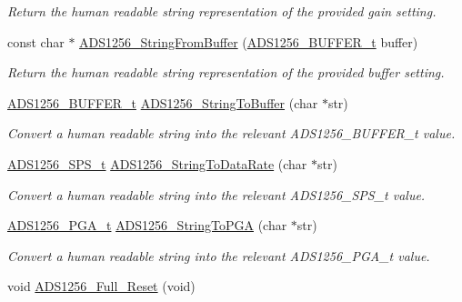 \begin{DoxyCompactItemize}
\begin{DoxyCompactList}\small\item\em Return the human readable string representation of the provided gain setting. \end{DoxyCompactList}\item 
const char $\ast$ \hyperlink{group__ads1256__driver_gafab91604ac5588b9c626bb7e050f0774}{A\-D\-S1256\-\_\-\-String\-From\-Buffer} (\hyperlink{group__ads1256__driver_ga12f71f8fc93fe63fb3c855ddd2070890}{A\-D\-S1256\-\_\-\-B\-U\-F\-F\-E\-R\-\_\-t} buffer)
\begin{DoxyCompactList}\small\item\em Return the human readable string representation of the provided buffer setting. \end{DoxyCompactList}\item 
\hyperlink{group__ads1256__driver_ga12f71f8fc93fe63fb3c855ddd2070890}{A\-D\-S1256\-\_\-\-B\-U\-F\-F\-E\-R\-\_\-t} \hyperlink{group__ads1256__driver_gac39cc4f0a18e9f7ce3f915d5b5050d94}{A\-D\-S1256\-\_\-\-String\-To\-Buffer} (char $\ast$str)
\begin{DoxyCompactList}\small\item\em Convert a human readable string into the relevant A\-D\-S1256\-\_\-\-B\-U\-F\-F\-E\-R\-\_\-t value. \end{DoxyCompactList}\item 
\hyperlink{group__ads1256__driver_gab0437f81aad031aadf3e05dd5fe0a731}{A\-D\-S1256\-\_\-\-S\-P\-S\-\_\-t} \hyperlink{group__ads1256__driver_gae2f1be4b151cfc9dfeede38a79764dff}{A\-D\-S1256\-\_\-\-String\-To\-Data\-Rate} (char $\ast$str)
\begin{DoxyCompactList}\small\item\em Convert a human readable string into the relevant A\-D\-S1256\-\_\-\-S\-P\-S\-\_\-t value. \end{DoxyCompactList}\item 
\hyperlink{group__ads1256__driver_gace2e231df7cd3598eb26d5ff51171701}{A\-D\-S1256\-\_\-\-P\-G\-A\-\_\-t} \hyperlink{group__ads1256__driver_ga04cf21f06b462886045c4075782fdf13}{A\-D\-S1256\-\_\-\-String\-To\-P\-G\-A} (char $\ast$str)
\begin{DoxyCompactList}\small\item\em Convert a human readable string into the relevant A\-D\-S1256\-\_\-\-P\-G\-A\-\_\-t value. \end{DoxyCompactList}\item 
void \hyperlink{group__ads1256__driver_ga7b012a2ab6b0494da4e1297e34ab9925}{A\-D\-S1256\-\_\-\-Full\-\_\-\-Reset} (void)

\end{DoxyCompactItemize}
